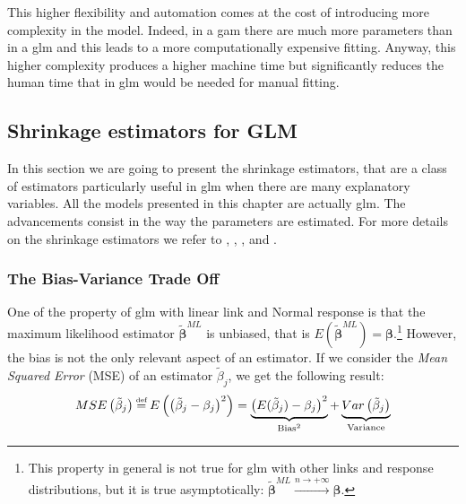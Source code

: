 \documentclass[a4paper, twoside, openright, 12pt]{report}
\newcommand\eqdef{\mathrel{\overset{\makebox[0pt]{\mbox{\normalfont\tiny def}}}{=}}}
\theoremstyle{definition}
\theoremstyle{definition}
\theoremstyle{definition}
\theoremstyle{remark}
\begin{document}
This higher flexibility and automation comes at the cost of introducing more complexity in the model. Indeed, in a \ac{gam} there are much more parameters than in a \ac{glm} and this leads to a more computationally expensive fitting. Anyway, this higher complexity produces a higher machine time but significantly reduces the human time that in \ac{glm} would be needed for manual fitting.

\newpage

\hypertarget{chap:shrinkage-estimators}{%
\subsection{Shrinkage estimators for GLM}\label{chap:shrinkage-estimators}}

In this section we are going to present the shrinkage estimators, that are a class of estimators particularly useful in \ac{glm} when there are many explanatory variables. All the models presented in this chapter are actually \ac{glm}. The advancements consist in the way the parameters are estimated. For more details on the shrinkage estimators we refer to \autocite{wuthrich-data-analytics}, \autocite{james2013introduction}, \autocite{friedman2001elements}, \autocite{portugues-predictive-modeling} and \autocite{ruppert2003semiparametric}.

\hypertarget{the-bias-variance-trade-off}{%
\subsubsection{The Bias-Variance Trade Off}\label{the-bias-variance-trade-off}}

One of the property of \ac{glm} with linear link and Normal response is that the maximum likelihood estimator \(\boldsymbol{\tilde{\beta}}^{ML}\) is unbiased, that is \(E\left(\boldsymbol{\tilde{\beta}}^{ML}\right) = \boldsymbol{\beta}\).\footnote{This property in general is not true for \ac{glm} with other links and response distributions, but it is true asymptotically: \(\boldsymbol{\tilde{\beta}}^{ML} \xrightarrow{n\to+\infty} \boldsymbol{\beta}\).} However, the bias is not the only relevant aspect of an estimator. If we consider the \emph{Mean Squared Error} (MSE) of an estimator \(\tilde{\beta}_j\), we get the following result:
\begin{equation}
\label{eq:bias-variance}
MSE\left(\tilde{\beta}_j\right) \eqdef E\left(\left(\tilde{\beta}_j - \beta_j\right)^2\right) =
\underbrace{\left( E(\tilde{\beta}_j)-\beta_j \right)^2}_{\text{Bias}^2} + 
\underbrace{Var\left( \tilde{\beta}_j \right)}_{\text{Variance}}
\end{equation}
\end{document}
